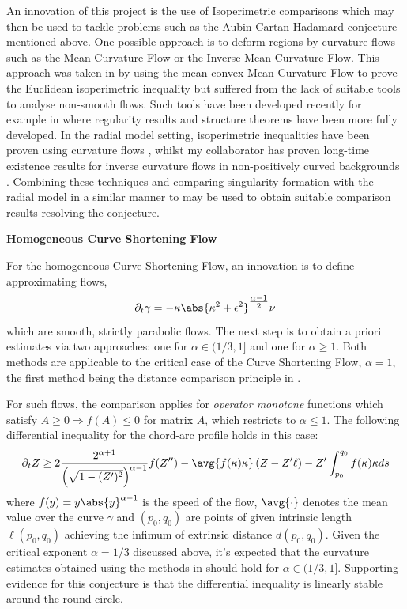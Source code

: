 \documentclass[12pt]{amsart}
\begin{document}
An innovation of this project is the use of Isoperimetric comparisons which may then be used to tackle problems such as the Aubin-Cartan-Hadamard conjecture mentioned above. One possible approach is to deform regions by curvature flows such as the Mean Curvature Flow or the Inverse Mean Curvature Flow. This approach was taken in \cite{MR2420018} by using the mean-convex Mean Curvature Flow to prove the Euclidean isoperimetric inequality but suffered from the lack of suitable tools to analyse non-smooth flows. Such tools have been developed recently for example in \cite{MR3570481,2013arXiv1304.0926H} where regularity results and structure theorems have been more fully developed. In the radial model setting, isoperimetric inequalities have been proven using curvature flows \cite{MR3439091,2016arXiv160908238G}, whilst my collaborator has proven long-time existence results for inverse curvature flows in non-positively curved backgrounds \cite{MR3581327}. Combining these techniques and comparing singularity formation with the radial model in a similar manner to \cite{MR1650335} may be used to obtain suitable comparison results resolving the conjecture.

\noindent\textbf{Homogeneous Curve Shortening Flow}
\label{sec-3-5}

For the homogeneous Curve Shortening Flow, an innovation is to define approximating flows,
\[
\partial_t \gamma = -\kappa\abs{\kappa^2 + \epsilon^2}^{\tfrac{\alpha-1}{2}} \nu
\]
which are smooth, strictly parabolic flows. The next step is to obtain a priori estimates via two approaches: one for $\alpha \in (1/3, 1]$ and one for $\alpha \geq 1$. Both methods are applicable to the critical case of the Curve Shortening Flow, $\alpha = 1$, the first method being the distance comparison principle in \cite{MR2794630}.

For such flows, the comparison applies for \emph{operator monotone} functions which satisfy $A \geq 0 \Rightarrow f(A) \leq 0$ for matrix $A$, which restricts to $\alpha \leq 1$. The following differential inequality for the chord-arc profile holds in this case:
\[
\partial_t Z \geq 2 \frac{2^{\alpha+1}}{\left(\sqrt{1 - (Z')^2}\right)^{\alpha-1}} f(Z'') - \avg{f(\kappa) \kappa} \left(Z - Z'\ell\right) - Z' \int_{p_0}^{q_0} f(\kappa)\kappa ds
\]
where $f(y) = y\abs{y}^{\alpha-1}$ is the speed of the flow, $\avg{\cdot}$ denotes the mean value over the curve $\gamma$ and $(p_0, q_0)$ are points of given intrinsic length $\ell(p_0, q_0)$ achieving the infimum of extrinsic distance $d(p_0, q_0)$. Given the critical exponent $\alpha=1/3$ discussed above, it's expected that the curvature estimates obtained using the methods in \cite{MR2794630} should hold for $\alpha \in (1/3, 1]$. Supporting evidence for this conjecture is that the differential inequality is linearly stable around the round circle.
\end{document}
